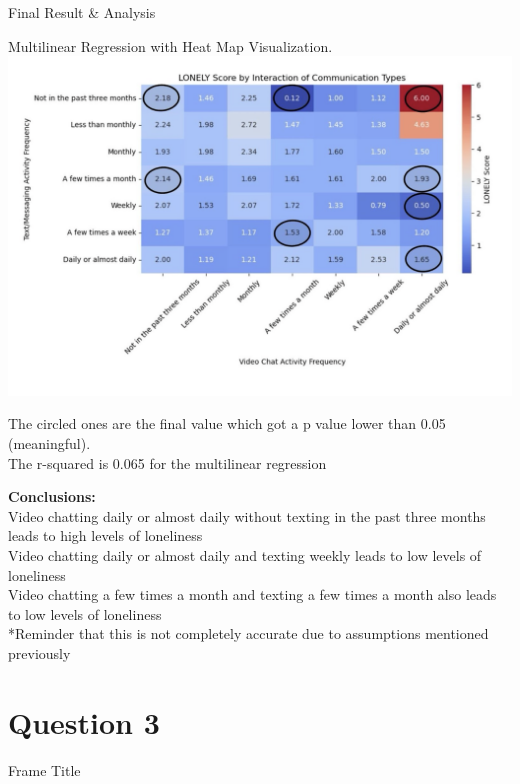 \documentclass{beamer}
\begin{document}
\begin{frame}{Final Result & Analysis}

Multilinear Regression with Heat Map Visualization.\\

\includegraphics[width=0.5\linewidth]{presentation/Screenshot 2024-11-28 at 12.02.27 PM.png}

The circled ones are the final value which got a p value lower than 0.05 (meaningful).\\
The r-squared is 0.065 for the multilinear regression\\
\end{frame}

\begin{frame}
\textbf{Conclusions:}\\
Video chatting daily or almost daily without texting in the past three months leads to high levels of loneliness\\
Video chatting daily or almost daily and texting weekly leads to low levels of loneliness\\
Video chatting a few times a month and texting a few times a month also leads to low levels of loneliness\\

*Reminder that this is not completely accurate due to assumptions mentioned previously\\
\end{frame}

\section{Question 3}
\begin{frame}{Frame Title}
    
\end{frame}
\end{document}
